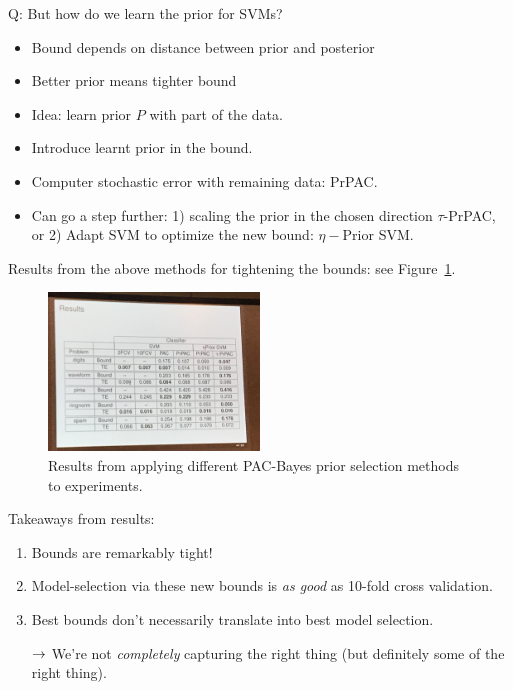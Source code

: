 Q: But how do we learn the prior for SVMs?
\begin{itemize}
    \item Bound depends on distance between prior and posterior
    \item Better prior means tighter bound
    \item Idea: learn prior $P$ with part of the data.
    \item Introduce learnt prior in the bound.
    \item Computer stochastic error with remaining data: PrPAC.
    \item Can go a step further: 1) scaling the prior in the chosen direction $\tau$-PrPAC, or 2) Adapt SVM to optimize the new bound: $\eta-$Prior SVM.
\end{itemize}

Results from the above methods for tightening the bounds: see Figure~\ref{fig:pb_results}. \\

\begin{figure}
    \centering
    \includegraphics[width=0.5\textwidth]{images/pb_results.JPG}
    \caption{Results from applying different PAC-Bayes prior selection methods to experiments.}
    \label{fig:pb_results}
\end{figure}

Takeaways from results:
\begin{enumerate}
    \item Bounds are remarkably tight!
    \item Model-selection via these new bounds is {\it as good} as 10-fold cross validation.
    \item Best bounds don't necessarily translate into best model selection.
    
    $\rightarrow$ We're not {\it completely} capturing the right thing (but definitely some of the right thing).
\end{enumerate}

